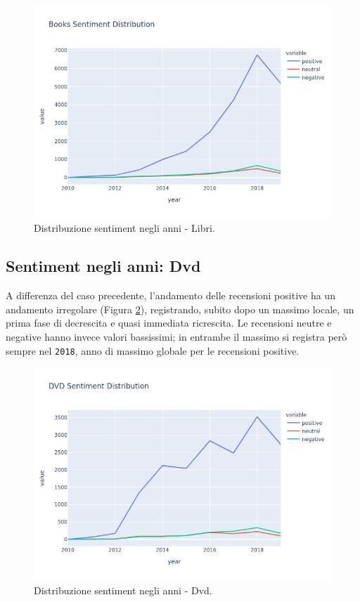 			\begin{figure} [h]
				\includegraphics[width=\textwidth]{Figure/sent_year_books}
				\caption{Distribuzione sentiment negli anni - Libri.}
				\label{fig:sent_year_books}
			\end{figure}
		
		\subsection{Sentiment negli anni: Dvd}
			A differenza del caso precedente, l'andamento delle recensioni positive ha un andamento irregolare (Figura \ref{fig:sent_year_dvd}), registrando, subito dopo un massimo locale, un prima fase di  decrescita e quasi immediata ricrescita. Le recensioni neutre e negative hanno invece valori bassissimi; in entrambe il massimo si registra però sempre nel \verb|2018|, anno di massimo globale per le recensioni positive.
			
			\begin{figure} [h]
				\includegraphics[width=\textwidth]{Figure/sent_year_dvd}
				\caption{Distribuzione sentiment negli anni - Dvd.}
				\label{fig:sent_year_dvd}
			\end{figure}
		
